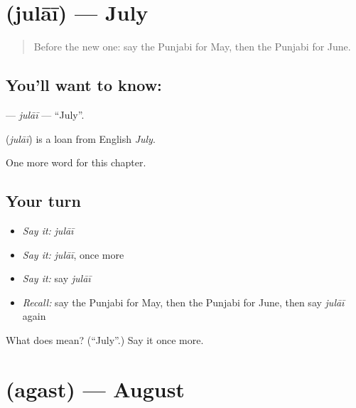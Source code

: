 \section[\texorpdfstring{\pa{ਜੁਲਾਈ} (julāī)}{ਜੁਲਾਈ (julāī)}]{ (julāī) — July}

\label{lesson:PA-C102-julai}



\begin{quote}
Before the new one: say the Punjabi for May, then the Punjabi for June.
\end{quote}

\subsection*{You'll want to know: }
\textbf{} — \emph{julāī} — \textquotedblleft{}July\textquotedblright{}.

\begin{cousinweb}
\textbf{} (\emph{julāī}) is a loan from English \emph{July}.
\end{cousinweb}

\begin{grammarlens}[title={What you've built}]
One more word for this chapter.
\end{grammarlens}

\subsection*{Your turn}
\begin{itemize}
\raggedright
  \item \emph{Say it:} \emph{julāī}
  \item \emph{Say it:} \emph{julāī}, once more
  \item \emph{Say it:} say \emph{julāī}
  \item \emph{Recall:} say the Punjabi for May, then the Punjabi for June, then say \emph{julāī} again
\end{itemize}

\begin{tcolorbox}[breakable,colback=teal!4,colframe=teal!35!black,title={Before you move on}]
What does  mean? (\textquotedblleft{}July\textquotedblright{}.) Say it once more.
\end{tcolorbox}
\section[\texorpdfstring{\pa{ਅਗਸਤ} (agast)}{ਅਗਸਤ (agast)}]{ (agast) — August}

